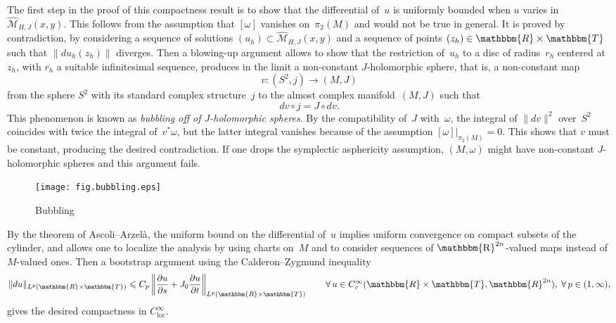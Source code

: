 \documentclass[12pt,twoside]{amsart}
\theoremstyle{plain}
\numberwithin{figure}{section}
\numberwithin{equation}{section}
\def\RR{\mathbbm{R}}
\def\TT{\mathbbm{T}}
\def\R{\operatorname{\mathbbm{R}}}
\begin{document}
The first step in the proof of this compactness result is to show that the differential of~$u$ is 
uniformly bounded when $u$ varies in $\widehat{\mathcal{M}}_{H,J}(x,y)$. This follows from the assumption that $[\omega]$ vanishes on~$\pi_2(M)$ and would not be true in general. 
It is proved by contradiction, by considering a sequence of solutions 
$(u_h) \subset \widehat{\mathcal{M}}_{H,J}(x,y)$ and a sequence of points $(z_h)\in \RR \times \TT$ 
such that $\|du_h(z_h)\|$ diverges. Then a blowing-up argument allows to show that the restriction 
of~$u_h$ to a disc of radius~$r_h$ centered at~$z_h$, with $r_h$ a suitable infinitesimal sequence, 
produces in the limit a non-constant $J$-holomorphic sphere, that is, a non-constant map
\[
v \colon (S^2,j) \rightarrow (M,J)
\]
from the sphere $S^2$ with its standard complex structure~$j$ to the almost complex manifold~$(M,J)$ 
such that
$$
dv \circ j = J \circ dv .
$$
This phenomenon is known as {\em bubbling off of $J$-holomorphic spheres}.
By the compatibility of~$J$ with~$\omega$, the integral of $\|dv\|^2$ over~$S^2$ coincides with twice the integral of~$v^* \omega$, but the latter integral vanishes because of 
the assumption $[\omega]|_{\pi_2(M)}=0$. This shows that $v$ must be constant, 
producing the desired contradiction. If one drops the symplectic asphericity assumption, 
$(M,\omega)$ might have non-constant $J$-holomorphic spheres and this argument fails. 


\begin{figure}[h]   
 \begin{center}
  \leavevmode\texttt{[image: fig.bubbling.eps]}
 \end{center}
 \caption{Bubbling}  \label{fig.bubbling}
\end{figure}


By the theorem of Ascoli--Arzel\`a, the uniform bound on the differential of~$u$ implies uniform convergence on compact subsets of the cylinder, and allows one to localize the analysis by using charts on~$M$ and to consider sequences of $\R^{2n}$-valued maps instead of $M$-valued ones. 
Then a bootstrap argument using the Calderon--Zygmund inequality
\[
\|du\|_{L^p(\RR\times \TT)} \leqslant C_p \left\| \frac{\partial u}{\partial s}  + J_0 \frac{\partial u}{\partial t} \right\|_{L^p(\RR\times \TT)} \qquad 
\forall \, u \in C^{\infty}_c(\RR\times \TT,\RR^{2n}), \; \forall \, p\in (1,\infty),
\]
gives the desired compactness in $C^{\infty}_{\mathrm{loc}}$.
  
\end{document}
